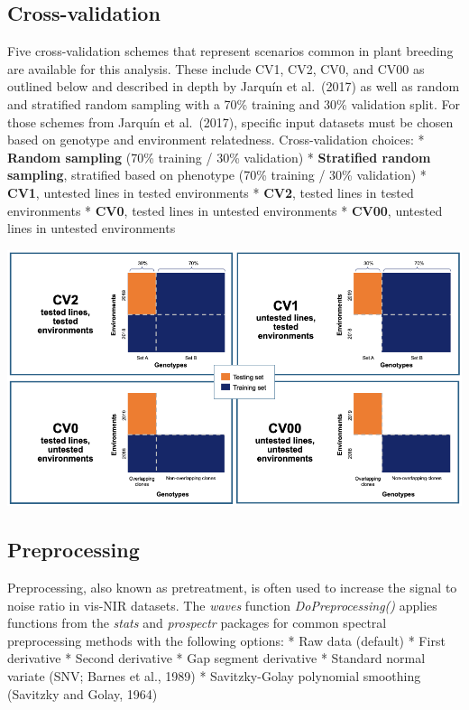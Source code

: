 \documentclass[
  12pt,
]{book}
\begin{document}
\hypertarget{cross-validation}{%
\subsection{Cross-validation}\label{cross-validation}}

Five cross-validation schemes that represent scenarios common in plant breeding are available for this analysis. These include CV1, CV2, CV0, and CV00 as outlined below and described in depth by Jarquín et al.~(2017) as well as random and stratified random sampling with a 70\% training and 30\% validation split. For those schemes from Jarquín et al.~(2017), specific input datasets must be chosen based on genotype and environment relatedness. Cross-validation choices: * \textbf{Random sampling} (70\% training / 30\% validation) * \textbf{Stratified random sampling}, stratified based on phenotype (70\% training / 30\% validation) * \textbf{CV1}, untested lines in tested environments * \textbf{CV2}, tested lines in tested environments * \textbf{CV0}, tested lines in untested environments * \textbf{CV00}, untested lines in untested environments

\begin{center}\includegraphics[width=0.95\linewidth]{assets/images/manage_NIRS_cv} \end{center}

\hypertarget{preprocessing}{%
\subsection{Preprocessing}\label{preprocessing}}

Preprocessing, also known as pretreatment, is often used to increase the signal to noise ratio in vis-NIR datasets. The \emph{waves} function \emph{DoPreprocessing()} applies functions from the \emph{stats} and \emph{prospectr} packages for common spectral preprocessing methods with the following options: * Raw data (default) * First derivative * Second derivative * Gap segment derivative * Standard normal variate (SNV; Barnes et al., 1989) * Savitzky-Golay polynomial smoothing (Savitzky and Golay, 1964)
\end{document}
